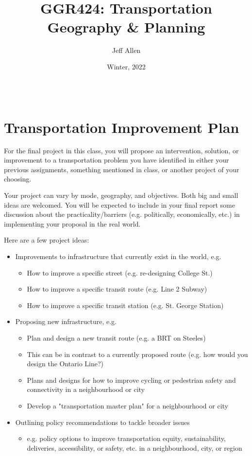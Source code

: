 \documentclass[11pt]{article}
\title{\textbf{GGR424: Transportation Geography \& Planning}}
\author{Jeff Allen}
\date{Winter, 2022}
\begin{document}
	
	\allsectionsfont{\sffamily}
	
	\section*{\\Transportation Improvement Plan}
	
	
	For the final project in this class, you will propose an intervention, solution, or improvement to a transportation problem you have identified in either your previous assignments, something mentioned in class, or another project of your choosing. 
	
	Your project can vary by mode, geography, and objectives. Both big and small ideas are welcomed. You will be expected to include in your final report some discussion about the practicality/barriers (e.g. politically, economically, etc.) in implementing your proposal in the real world.
	
	Here are a few project ideas:
	\begin{itemize}
		\item Improvements to infrastructure that currently exist in the world, e.g.
		\begin{itemize}
			\item How to improve a specific street (e.g. re-designing College St.)
			\item How to improve a specific transit route (e.g. Line 2 Subway)
			\item How to improve a specific transit station (e.g. St. George Station)
		\end{itemize}
		\item Proposing new infrastructure, e.g.
		\begin{itemize}
			\item Plan and design a new transit route (e.g. a BRT on Steeles)
			\item This can be in contrast to a currently proposed route (e.g. how would you design the Ontario Line?)
			\item Plans and designs for how to improve cycling or pedestrian safety and connectivity in a neighbourhood or city
			\item Develop a "transportation master plan" for a neighbourhood or city
		\end{itemize}
		\item Outlining policy recommendations to tackle broader issues
		\begin{itemize}
			\item e.g. policy options to improve transportation equity, sustainability, deliveries, accessibility, or safety, etc. in a neighbourhood, city, or region
		\end{itemize}
	\end{itemize}
	
\end{document}
